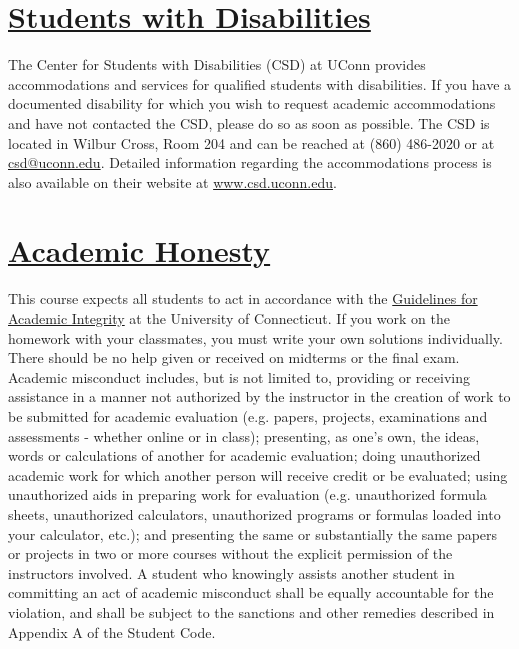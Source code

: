 \documentclass[11pt]{article}
\begin{document}
\section*{\underline{Students with Disabilities}}
The Center for Students with Disabilities (CSD) at UConn provides accommodations and services for qualified students with disabilities. If you have a documented disability for which you wish to request academic accommodations and have not contacted the CSD, please do so as soon as possible. The CSD is located in Wilbur Cross, Room 204 and can be reached at (860) 486-2020 or at \href{mailto:csd@uconn.edu}{csd@uconn.edu}. Detailed information regarding the accommodations process is also available on their website at \url{www.csd.uconn.edu}.

\section*{\underline{Academic Honesty}}
This course expects all students to act in accordance with the \href{http://community.uconn.edu/the-student-code-appendix-a/}{Guidelines for Academic Integrity} at the University of Connecticut.  If you work on the homework with your classmates, you must write your own solutions individually. There should be no help given or received on midterms or the final exam. Academic misconduct includes, but is not limited to, providing or receiving assistance in a manner not authorized by the instructor in the creation of work to be submitted for academic evaluation (e.g. papers, projects, examinations and assessments - whether online or in class); presenting, as one's own, the ideas, words or calculations of another for academic evaluation; doing unauthorized academic work for which another person will receive credit or be evaluated; using unauthorized aids in preparing work for evaluation (e.g. unauthorized formula sheets, unauthorized calculators, unauthorized programs or formulas loaded into your calculator, etc.); and presenting the same or substantially the same papers or projects in two or more courses without the explicit permission of the instructors involved. A student who knowingly assists another student in committing an act of academic misconduct shall be equally accountable for the violation, and shall be subject to the sanctions and other remedies described in Appendix A of the Student Code. 
\end{document}
